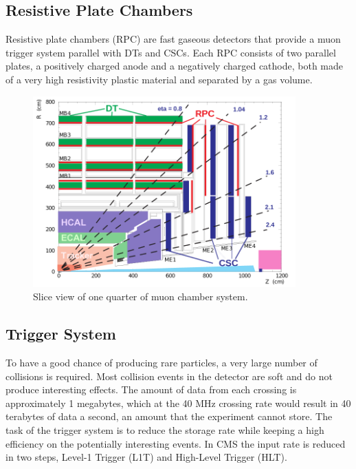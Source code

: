 \subsection*{Resistive Plate Chambers}
Resistive plate chambers (RPC) are fast gaseous detectors that provide a muon trigger system parallel with DTs and CSCs. Each RPC consists of two parallel plates, a positively charged anode and a negatively charged cathode, both made of a very high resistivity plastic material and separated by a gas volume.

\begin{figure}[hbtp]
  \begin{center}
    \includegraphics[width=0.9\textwidth]{figure/CH2/MuonSys.png}
  \end{center}
  \caption{\label{fig:MuonSys}Slice view of one quarter of muon chamber system.}
\end{figure}

\subsection{Trigger System}

To have a good chance of producing rare particles, a very large number of collisions is required. Most collision events in the detector are soft and do not produce interesting effects. The amount of data from each crossing is approximately 1 megabytes, which at the 40 MHz crossing rate would result in 40 terabytes of data a second, an amount that the experiment cannot store. The task of the trigger system is to reduce the storage rate while keeping a high efficiency on the potentially interesting events. In CMS the input rate is reduced in two steps, Level-1 Trigger (L1T) and High-Level Trigger (HLT).


